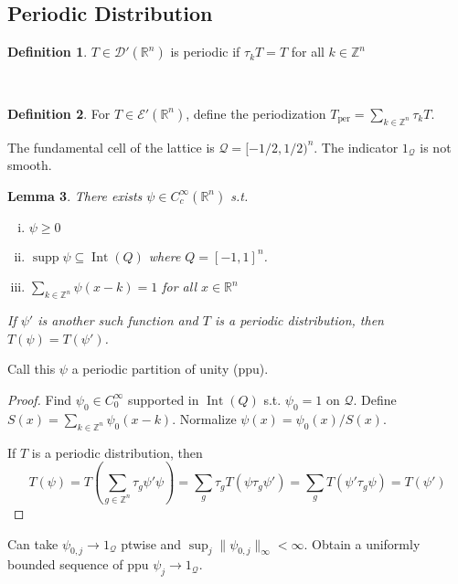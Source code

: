 \documentclass{article}
\theoremstyle{definition}
\newtheorem{defn}{Definition}[section]
\theoremstyle{remark}
\theoremstyle{plain}
\newtheorem{lem}[defn]{Lemma}
\newcommand{\ZZ}{\mathbb{Z}}
\newcommand{\RR}{\mathbb{R}}
\newcommand{\calD}{\mathcal{D}}
\begin{document}
\subsection{Periodic Distribution}
\begin{defn}
    $T\in\calD'(\RR^n)$ is periodic if $\tau_k T=T$ for all $k\in\ZZ^n$
\end{defn}\
\begin{defn}
    For $T\in\mathcal E'(\RR^n)$, define the periodization $T_{\text{per}}=\sum_{k\in\ZZ^n}\tau_k T$.
\end{defn}
The fundamental cell of the lattice is $\mathcal Q=[-1/2,1/2)^n$. The indicator $1_{\mathcal Q}$ is not smooth.
\begin{lem}
    There exists $\psi\in C_c^\infty(\RR^n)$ s.t. \begin{enumerate}[(i)]
        \item $\psi\ge 0$
        \item $\operatorname{supp}\psi\subseteq\operatorname{Int}(Q)$ where $Q=[-1,1]^n$.
        \item $\sum_{k\in\ZZ^n}\psi(x-k)=1$ for all $x\in\RR^n$
    \end{enumerate}
    If $\psi'$ is another such function and $T$ is a periodic distribution, then $T(\psi)=T(\psi')$.
\end{lem}
Call this $\psi$ a periodic partition of unity (ppu).
\begin{proof}
    Find $\psi_0\in C_0^\infty$ supported in $\operatorname{Int}(Q)$ s.t. $\psi_0=1$ on $\mathcal Q$. Define $S(x)=\sum_{k\in\ZZ^n}\psi_0(x-k)$. Normalize $\psi(x)=\psi_0(x)/S(x)$.

    If $T$ is a periodic distribution, then
    \[T(\psi)=T(\sum_{g\in \ZZ^n}\tau_g\psi'\psi)=\sum_g\tau_g T(\psi\tau_g\psi')=\sum_gT(\psi'\tau_g\psi)=T(\psi')\]
\end{proof}
Can take $\psi_{0,j}\to 1_{\mathcal Q}$ ptwise and $\sup_j\|\psi_{0,j}\|_\infty<\infty$. Obtain a uniformly bounded sequence of ppu $\psi_j\to 1_{\mathcal Q}$.
\end{document}
